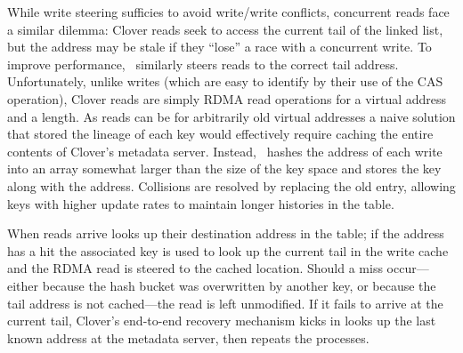 While write steering sufficies to avoid write/write conflicts,
concurrent reads face a similar dilemma: Clover reads seek to access
the current tail of the linked list, but the address may be stale if
they ``lose'' a race with a concurrent write.  To improve performance,
\sword\ similarly steers reads to the correct tail address.
%
Unfortunately, unlike writes (which are easy to identify by their use
of the CAS operation), Clover reads are simply RDMA read operations
for a virtual address and a length.
As reads can be for arbitrarily old virtual addresses a naive solution
that stored the lineage of each key would effectively require caching
the entire contents of Clover's metadata server.  Instead,
\sword\ hashes the address of each write into an array somewhat larger
than the size of the key space and stores the key along with the
address.  Collisions are resolved by replacing the old
entry, allowing keys with higher update rates to
maintain longer histories in the table.

When reads arrive {\sword} looks up their destination address in the
table; if the address has a hit the associated key is used to look up
the current tail in the write cache and the RDMA read is steered to
the cached location.  Should a miss occur---either because the hash
bucket was overwritten by another key, or because the tail address is
not cached---the read is left unmodified.  If it fails to arrive at
the current tail, Clover's end-to-end recovery mechanism kicks in
looks up the last known address at the metadata server, then repeats
the processes.


